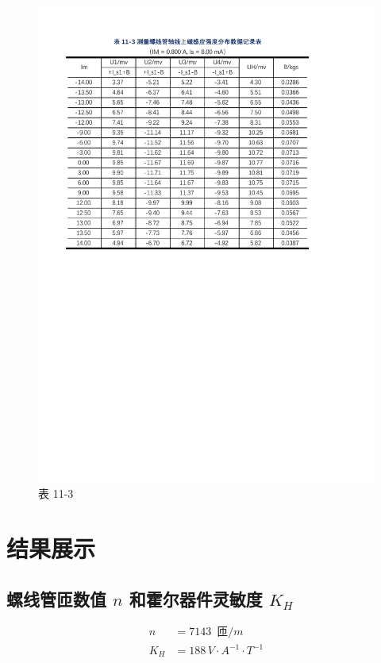\documentclass[12pt]{article}
\begin{document}
\begin{figure}[H] %
    \centering
    \includegraphics[width=\textwidth]{./figures/表11-3.pdf} 
    \caption{表 11-3}
    \label{fig:table_data3}
\end{figure}

\section{\normalfont 结果展示}

\subsection{\normalfont 螺线管匝数值 $n$ 和霍尔器件灵敏度 $K_H$}


\begin{align*}
n &= 7143 \, \text{ 匝$/m$} \\
K_H &= 188 \, \text{$V \cdot A^{-1} \cdot T^{-1}$} 
\end{align*}
\end{document}
